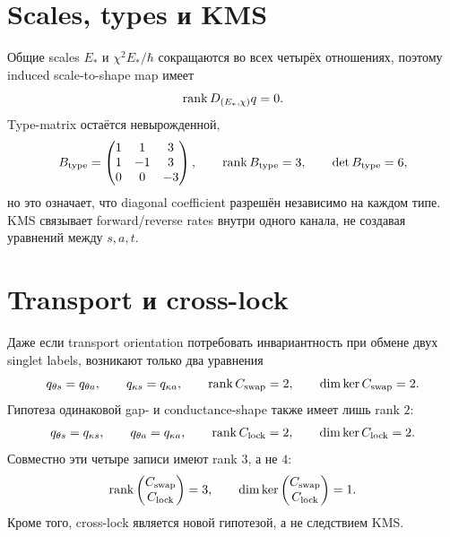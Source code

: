 \section{Scales, types и KMS}

Общие scales $E_*$ и $\chi^2E_*/\hbar$ сокращаются во всех четырёх
отношениях, поэтому induced scale-to-shape map имеет
\begin{equation}
 \operatorname{rank} D_{(E_*,\chi)}q=0.
 \label{eq:v9-kms-shape-source-origin-scale-rank}
\end{equation}
Type-matrix остаётся невырожденной,
\begin{equation}
 B_{\rm type}=\begin{pmatrix}1&1&3\\1&-1&3\\0&0&-3\end{pmatrix},
 \qquad \operatorname{rank} B_{\rm type}=3,
 \qquad \det B_{\rm type}=6,
 \label{eq:v9-kms-shape-source-origin-type-matrix}
\end{equation}
но это означает, что diagonal coefficient разрешён независимо на каждом
типе. KMS связывает forward/reverse rates внутри одного канала, не создавая
уравнений между $s,a,t$.

\section{Transport и cross-lock}

Даже если transport orientation потребовать инвариантность при обмене двух
singlet labels, возникают только два уравнения
\begin{equation}
 q_{\theta s}=q_{\theta a},
 \qquad q_{\kappa s}=q_{\kappa a},
 \qquad \operatorname{rank} C_{\rm swap}=2,
 \qquad \dim\ker C_{\rm swap}=2.
 \label{eq:v9-kms-shape-source-origin-swap-constraints}
\end{equation}
Гипотеза одинаковой gap- и conductance-shape также имеет лишь rank $2$:
\begin{equation}
 q_{\theta s}=q_{\kappa s},
 \qquad q_{\theta a}=q_{\kappa a},
 \qquad \operatorname{rank} C_{\rm lock}=2,
 \qquad \dim\ker C_{\rm lock}=2.
 \label{eq:v9-kms-shape-source-origin-cross-lock}
\end{equation}
Совместно эти четыре записи имеют rank $3$, а не $4$:
\begin{equation}
 \operatorname{rank}\begin{pmatrix}C_{\rm swap}\\C_{\rm lock}\end{pmatrix}=3,
 \qquad
 \dim\ker\begin{pmatrix}C_{\rm swap}\\C_{\rm lock}\end{pmatrix}=1.
 \label{eq:v9-kms-shape-source-origin-combined-rank}
\end{equation}
Кроме того, cross-lock является новой гипотезой, а не следствием KMS.

